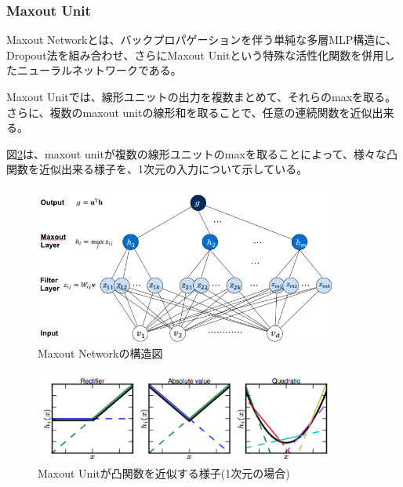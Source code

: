 \subsubsection{Maxout Unit}
Maxout Networkとは、バックプロパゲーションを伴う単純な多層MLP構造に、Dropout法を組み合わせ、さらにMaxout Unitという特殊な活性化関数を併用したニューラルネットワークである。\par
Maxout Unitでは、線形ユニットの出力を複数まとめて、それらのmaxを取る。さらに、複数のmaxout unitの線形和を取ることで、任意の連続関数を近似出来る。\par
図\ref{c3_maxout_app}は、maxout unitが複数の線形ユニットのmaxを取ることによって、様々な凸関数を近似出来る様子を、1次元の入力について示している。
\begin{figure}[tbp]
 \begin{center}
  \includegraphics[width=100mm]{img/c3/maxout_arch}
 \end{center}
 \caption{Maxout Networkの構造図}
 \label{c3_maxout_arch}
\end{figure}
\begin{figure}[tbp]
 \begin{center}
  \includegraphics[width=100mm]{img/c3/maxout_app}
 \end{center}
 \caption{Maxout Unitが凸関数を近似する様子(1次元の場合)}
 \label{c3_maxout_app}
\end{figure}
